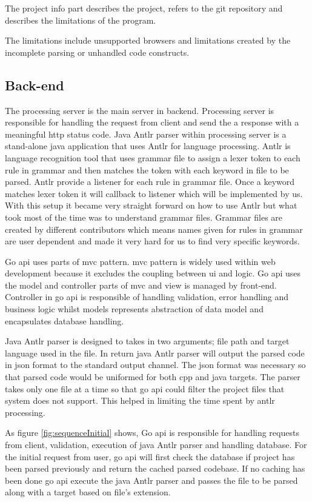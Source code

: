 The project info part describes the project, refers to the \gls{git} repository  and describes the limitations of the program.

The limitations include unsupported browsers and limitations created by the incomplete parsing or unhandled code constructs.

\subsection{Back-end}
The processing server is the main server in \gls{backend}. Processing server is responsible for handling the request from \gls{client} and send the a response with a meaningful \gls{http} status code. Java \gls{Antlr} parser within processing server is a stand-alone java application that uses \gls{Antlr} for language processing. \gls{Antlr} is language recognition tool that uses grammar file to assign a lexer token to each rule in grammar and then matches the token with each keyword in file to be parsed. \gls{Antlr} provide a listener for each rule in grammar file. Once a keyword matches lexer token it will callback to listener which will be implemented by us. With this setup it became very straight forward on how to use \gls{Antlr} but what took most of the time was to understand grammar files. Grammar files are created by different contributors which means names given for rules in grammar are user dependent and made it very hard for us to find very specific keywords.

Go \gls{api} uses parts of \gls{mvc} pattern. \gls{mvc} pattern is widely used within web development because it excludes the coupling between \gls{ui} and logic. Go \gls{api} uses the model and controller parts of \gls{mvc} and view is managed by front-end. Controller in go \gls{api} is responsible of handling validation, error handling and business logic whilst models represents abstraction of data model and encapsulates database handling.

Java \gls{Antlr} parser is designed to takes in two arguments; file path and target language used in the file. In return java \gls{Antlr} parser will output the parsed code in \gls{json} format to the standard output channel. The \gls{json} format was necessary so that parsed code would be uniformed for both cpp and java targets. 
The parser takes only one file at a time so that go \gls{api} could filter the project files that system does not support. This helped in limiting the time spent by antlr processing.

As figure \ref{fig:sequenceInitial} shows, Go \gls{api} is responsible for handling requests from \gls{client}, validation, execution of java \gls{Antlr} parser and handling database. For the initial request from user, go \gls{api} will first check the database if project has been parsed previously and return the cached parsed codebase. If no caching has been done go \gls{api} execute the java \gls{Antlr} parser and passes the file to be parsed along with a target based on file's extension.

